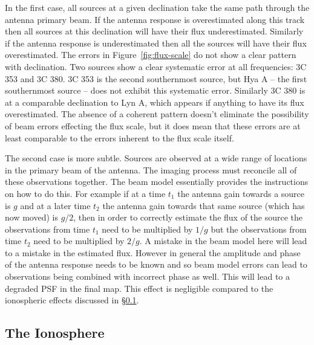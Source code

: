 \documentclass[twocolumn]{aastex61}
\begin{document}
In the first case, all sources at a given declination take the same path through the antenna primary
beam. If the antenna response is overestimated along this track then all sources at this declination
will have their flux underestimated. Similarly if the antenna response is underestimated then all
the sources will have their flux overestimated. The errors in Figure~\ref{fig:flux-scale} do not
show a clear pattern with declination. Two sources show a clear systematic error at all frequencies:
3C 353 and 3C 380. 3C 353 is the second southernmost source, but Hya A -- the first southernmost
source -- does not exhibit this systematic error. Similarly 3C 380 is at a comparable declination to
Lyn A, which appears if anything to have its flux overestimated. The absence of a coherent pattern
doesn't eliminate the possibility of beam errors effecting the flux scale, but it does mean that
these errors are at least comparable to the errors inherent to the flux scale itself.

The second case is more subtle. Sources are observed at a wide range of locations in the primary
beam of the antenna. The imaging process must reconcile all of these observations together. The beam
model essentially provides the instructions on how to do this. For example if at a time $t_1$ the
antenna gain towards a source is $g$ and at a later time $t_2$ the antenna gain towards that same
source (which has now moved) is $g/2$, then in order to correctly estimate the flux of the source
the observations from time $t_1$ need to be multiplied by $1/g$ but the observations from time $t_2$
need to be multiplied by $2/g$. A mistake in the beam model here will lead to a mistake in the
estimated flux.  However in general the amplitude and phase of the antenna response needs to be
known and so beam model errors can lead to observations being combined with incorrect phase as well.
This will lead to a degraded PSF in the final map. This effect is negligible compared to the
ionospheric effects discussed in \S\ref{sec:ionosphere}.

\subsection{The Ionosphere}\label{sec:ionosphere}
\end{document}
